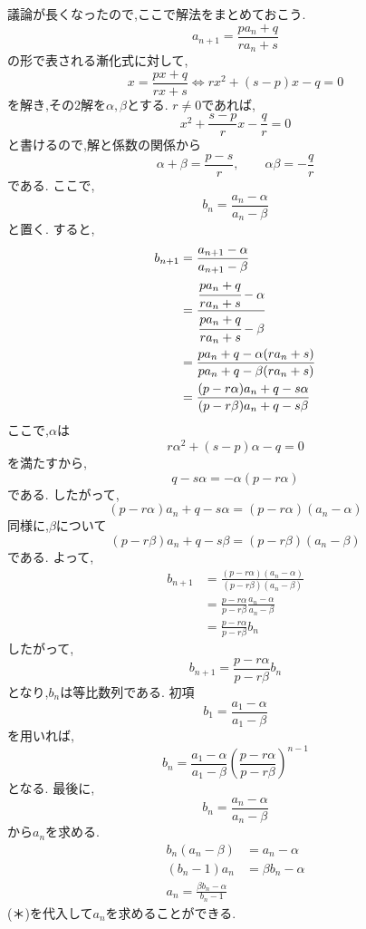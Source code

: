     議論が長くなったので,ここで解法をまとめておこう.
    \[
      a_{n+1}=\frac{pa_n+q}{ra_n+s} 
    \]
    の形で表される漸化式に対して,
    \[
      x= \frac{px+q}{rx+s} \Leftrightarrow rx^2+(s-p)x-q=0
    \]
    を解き,その2解を$\alpha,\beta$とする.
    $r\neq0$であれば,
    \[
      x^2+\frac{s-p}{r}x-\frac qr=0
    \]
    と書けるので,解と係数の関係から
    \[
      \alpha+\beta=\frac{p-s}{r},
      \qquad
      \alpha\beta=-\frac qr
    \]
    である.
    ここで,
    \[
      b_n=\frac{a_n-\alpha}{a_n-\beta}
    \]
    と置く.
    すると,
    \begin{align*}
      b_{n+1}&=\frac{a_{n+1}-\alpha}{a_{n+1}-\beta}\\
      &=\cfrac{\displaystyle\cfrac{pa_n+q}{ra_n+s}-\alpha}{\displaystyle\cfrac{pa_n+q}{ra_n+s}-\beta}\\
      &=\frac{pa_n+q-\alpha(ra_n+s)}{pa_n+q-\beta(ra_n+s)}\\
      &=\frac{(p-r\alpha)a_n+q-s\alpha}{(p-r\beta)a_n+q-s\beta}
    \end{align*}
    ここで,$\alpha$は
    \[
      r\alpha^2+(s-p)\alpha-q=0
    \]
    を満たすから,
    \[
      q-s\alpha=-\alpha(p-r\alpha)
    \]
    である.
    したがって,
    \[
      (p-r\alpha)a_n+q-s\alpha
      =(p-r\alpha)(a_n-\alpha)
    \]
    同様に,$\beta$について
    \[
      (p-r\beta)a_n+q-s\beta
      =(p-r\beta)(a_n-\beta)
    \]
    である.
    よって,
    \begin{align*}
      b_{n+1}&=\frac{(p-r\alpha)(a_n-\alpha)}{(p-r\beta)(a_n-\beta)}\\
      &=\frac{p-r\alpha}{p-r\beta}\frac{a_n-\alpha}{a_n-\beta}\\
      &=\frac{p-r\alpha}{p-r\beta}b_n
    \end{align*}
    したがって,
    \[
      b_{n+1}=\frac{p-r\alpha}{p-r\beta}b_n
    \]
    となり,$b_n$は等比数列である.
    初項
    \[
      b_1=\frac{a_1-\alpha}{a_1-\beta}
    \]
    を用いれば,
    \[
      b_n=\frac{a_1-\alpha}{a_1-\beta}\left(\frac{p-r\alpha}{p-r\beta}\right)^{n-1} \tag*{\(\cdots\) (＊)}
    \]
    となる.
    最後に,
    \[
      b_n=\frac{a_n-\alpha}{a_n-\beta}
    \]
    から$a_n$を求める.
    \begin{align*}
      b_n(a_n-\beta)&=a_n-\alpha\\
      (b_n-1)a_n&=\beta b_n-\alpha\\
      a_n=\frac{\beta b_n-\alpha}{b_n-1}
    \end{align*}
    (＊)を代入して$a_n$を求めることができる.

